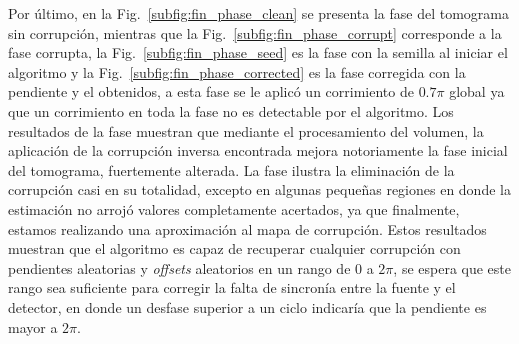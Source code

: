 Por último, en la Fig.~\ref{subfig:fin_phase_clean} se presenta la fase del tomograma sin corrupción, mientras que la Fig.~\ref{subfig:fin_phase_corrupt} corresponde a la fase corrupta, la Fig.~\ref{subfig:fin_phase_seed} es la fase con la semilla al iniciar el algoritmo y la Fig.~\ref{subfig:fin_phase_corrected} es la fase corregida con la pendiente y el \offset obtenidos, a esta fase se le aplicó un corrimiento de $0.7\pi$ global ya que un corrimiento en toda la fase no es detectable por el algoritmo. Los resultados de la fase muestran que mediante el procesamiento del volumen, la aplicación de la corrupción inversa encontrada mejora notoriamente la fase inicial del tomograma, fuertemente alterada. La fase ilustra la eliminación de la corrupción casi en su totalidad, excepto en algunas pequeñas regiones en donde la estimación no arrojó valores completamente acertados, ya que finalmente, estamos realizando una aproximación al mapa de corrupción. Estos resultados muestran que el algoritmo es capaz de recuperar cualquier corrupción con pendientes aleatorias y \textit{offsets} aleatorios en un rango de $0$ a $2\pi$, se espera que este rango sea suficiente para corregir la falta de sincronía entre la fuente y el detector, en donde un desfase superior a un ciclo indicaría que la pendiente es mayor a $2\pi$. 

